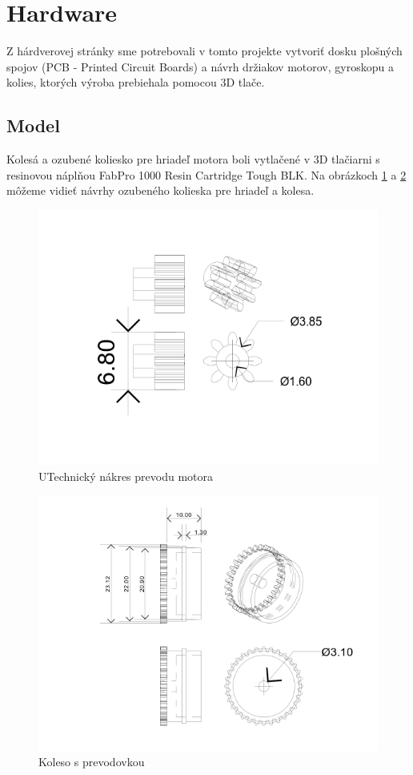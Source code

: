 
\section{Hardware}
Z hárdverovej stránky sme potrebovali v tomto projekte vytvoriť dosku plošných spojov (PCB - Printed Circuit Boards) a návrh držiakov motorov, gyroskopu a kolies, ktorých výroba prebiehala pomocou 3D tlače.
\subsection{Model}
\label{sec:hardware}
Kolesá a ozubené koliesko pre hriadeľ motora boli vytlačené v 3D tlačiarni s resinovou náplňou FabPro 1000 Resin Cartridge Tough BLK. Na obrázkoch \ref{fig:gear} a \ref{fig:wheel_w_gear} môžeme vidieť návrhy ozubeného kolieska pre hriadeľ a kolesa. 

\begin{figure}[!htbp]
		\centering
		\includegraphics[scale=0.8]{includes/images/motor_gear.png}
		\caption{UTechnický nákres prevodu motora}
		\label{fig:gear}
\end{figure}

\begin{figure}[!htbp]
		\centering
		\includegraphics[scale=0.8]{includes/images/wheel_w_gear_2_blueprint.png}
		\caption{Koleso s prevodovkou}
		\label{fig:wheel_w_gear}
\end{figure}
\newpage
